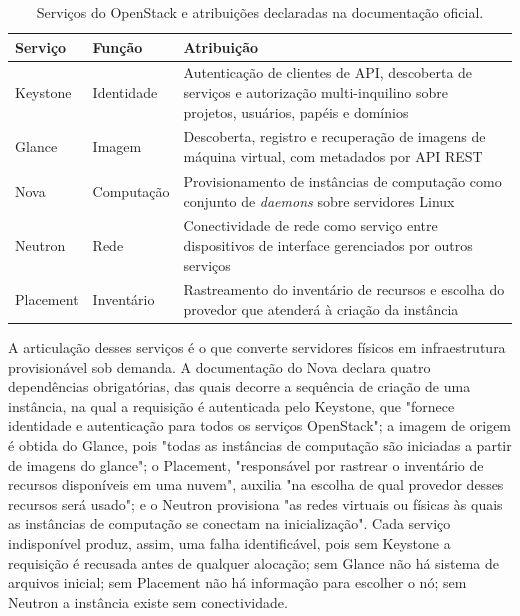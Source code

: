 \begin{table}[h!]
	\centering
	\caption{Serviços do OpenStack e atribuições declaradas na documentação oficial.}
	\label{tab:openstack-servicos}
	\footnotesize
	\renewcommand{\arraystretch}{1.15}
	\begin{tabularx}{\textwidth}{@{} l l X @{}}
		\toprule
		\textbf{Serviço} & \textbf{Função} & \textbf{Atribuição} \\
		\midrule
		Keystone & Identidade & Autenticação de clientes de API, descoberta de serviços e autorização multi-inquilino sobre projetos, usuários, papéis e domínios \\
		Glance & Imagem & Descoberta, registro e recuperação de imagens de máquina virtual, com metadados por API REST \\
		Nova & Computação & Provisionamento de instâncias de computação como conjunto de \emph{daemons} sobre servidores Linux \\
		Neutron & Rede & Conectividade de rede como serviço entre dispositivos de interface gerenciados por outros serviços \\
		Placement & Inventário & Rastreamento do inventário de recursos e escolha do provedor que atenderá à criação da instância \\
		\bottomrule
	\end{tabularx}
\end{table}

A articulação desses serviços é o que converte servidores físicos em infraestrutura provisionável sob demanda. A documentação do Nova declara quatro dependências obrigatórias, das quais decorre a sequência de criação de uma instância, na qual a requisição é autenticada pelo Keystone, que "fornece identidade e autenticação para todos os serviços OpenStack"; a imagem de origem é obtida do Glance, pois "todas as instâncias de computação são iniciadas a partir de imagens do glance"; o Placement, "responsável por rastrear o inventário de recursos disponíveis em uma nuvem", auxilia "na escolha de qual provedor desses recursos será usado"; e o Neutron provisiona "as redes virtuais ou físicas às quais as instâncias de computação se conectam na inicialização". Cada serviço indisponível produz, assim, uma falha identificável, pois sem Keystone a requisição é recusada antes de qualquer alocação; sem Glance não há sistema de arquivos inicial; sem Placement não há informação para escolher o nó; sem Neutron a instância existe sem conectividade.

